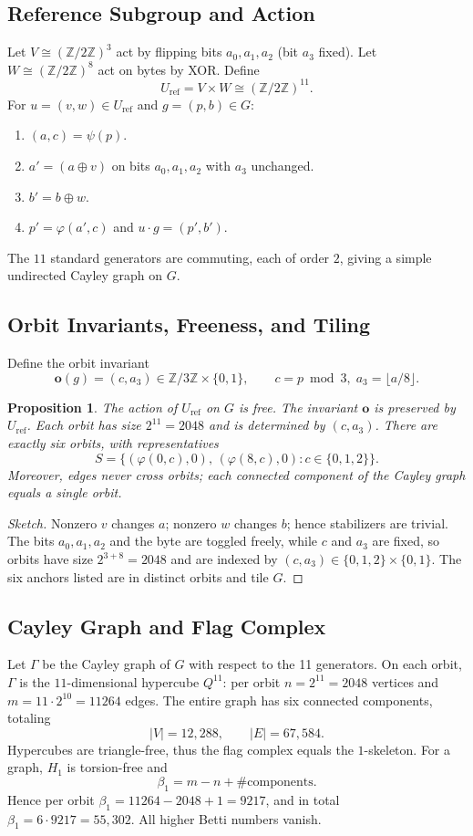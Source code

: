 \documentclass[12pt]{article}
\newtheorem{proposition}[theorem]{Proposition}
\begin{document}
\subsection{Reference Subgroup and Action}
Let $V\cong (\mathbb Z/2\mathbb Z)^3$ act by flipping bits $a_0,a_1,a_2$ (bit $a_3$ fixed). Let $W\cong (\mathbb Z/2\mathbb Z)^8$ act on bytes by XOR. Define
\[
U_{\mathrm{ref}}=V\times W\cong (\mathbb Z/2\mathbb Z)^{11}.
\]
For $u=(v,w)\in U_{\mathrm{ref}}$ and $g=(p,b)\in G$:
\begin{enumerate}\itemsep2pt
  \item $(a,c)=\psi(p)$.
  \item $a' = (a\oplus v)$ on bits $a_0,a_1,a_2$ with $a_3$ unchanged.
  \item $b' = b\oplus w$.
  \item $p' = \varphi(a',c)$ and $u\cdot g=(p',b')$.
\end{enumerate}
The $11$ standard generators are commuting, each of order $2$, giving a simple undirected Cayley graph on $G$.

\subsection{Orbit Invariants, Freeness, and Tiling}
Define the orbit invariant
\[
\mathbf o(g)=(c, a_3)\in \mathbb Z/3\mathbb Z\times\{0,1\},\qquad c=p\bmod 3,\; a_3=\lfloor a/8\rfloor.
\]
\begin{proposition}
The action of $U_{\mathrm{ref}}$ on $G$ is free. The invariant $\mathbf o$ is preserved by $U_{\mathrm{ref}}$. Each orbit has size $2^{11}=2048$ and is determined by $(c,a_3)$. There are exactly six orbits, with representatives
\[
S=\{(\varphi(0,c),0),\, (\varphi(8,c),0): c\in\{0,1,2\}\}.
\]
Moreover, edges never cross orbits; each connected component of the Cayley graph equals a single orbit.
\end{proposition}
\begin{proof}[Sketch]
Nonzero $v$ changes $a$; nonzero $w$ changes $b$; hence stabilizers are trivial. The bits $a_0,a_1,a_2$ and the byte are toggled freely, while $c$ and $a_3$ are fixed, so orbits have size $2^{3+8}=2048$ and are indexed by $(c,a_3)\in\{0,1,2\}\times\{0,1\}$. The six anchors listed are in distinct orbits and tile $G$.
\end{proof}

\subsection{Cayley Graph and Flag Complex}
Let $\Gamma$ be the Cayley graph of $G$ with respect to the 11 generators. On each orbit, $\Gamma$ is the $11$-dimensional hypercube $Q^{11}$: per orbit $n=2^{11}=2048$ vertices and $m=11\cdot 2^{10}=11264$ edges. The entire graph has six connected components, totaling
\[
|V|=12{,}288,\qquad |E|=67{,}584.
\]
Hypercubes are triangle-free, thus the flag complex equals the $1$-skeleton. For a graph, $H_1$ is torsion-free and
\[
\beta_1 = m-n+\#\text{components}.
\]
Hence per orbit $\beta_1=11264-2048+1=9217$, and in total $\beta_1=6\cdot 9217=55{,}302$. All higher Betti numbers vanish.
\end{document}
